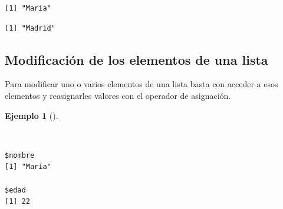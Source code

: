 \documentclass[
  a4paper,
]{scrreport}
\newenvironment{Shaded}{\begin{snugshade}}{\end{snugshade}}
\newcommand{\CommentTok}[1]{\textcolor[rgb]{0.37,0.37,0.37}{#1}}
\newcommand{\DecValTok}[1]{\textcolor[rgb]{0.68,0.00,0.00}{#1}}
\newcommand{\FunctionTok}[1]{\textcolor[rgb]{0.28,0.35,0.67}{#1}}
\newcommand{\NormalTok}[1]{\textcolor[rgb]{0.00,0.23,0.31}{#1}}
\newcommand{\OtherTok}[1]{\textcolor[rgb]{0.00,0.23,0.31}{#1}}
\newcommand{\SpecialCharTok}[1]{\textcolor[rgb]{0.37,0.37,0.37}{#1}}
\newcommand{\StringTok}[1]{\textcolor[rgb]{0.13,0.47,0.30}{#1}}
\theoremstyle{definition}
\theoremstyle{definition}
\newtheorem{example}{Ejemplo}[chapter]
\theoremstyle{remark}
\begin{document}
\begin{Shaded}
\end{Shaded}

\begin{verbatim}
[1] "María"
\end{verbatim}

\begin{Shaded}
\end{Shaded}

\begin{verbatim}
[1] "Madrid"
\end{verbatim}

\hypertarget{modificaciuxf3n-de-los-elementos-de-una-lista}{%
\subsection{Modificación de los elementos de una
lista}\label{modificaciuxf3n-de-los-elementos-de-una-lista}}

Para modificar uno o varios elementos de una lista basta con acceder a
esos elementos y reasignarles valores con el operador de asignación.

\begin{example}[]\protect\hypertarget{exm-modificacion-listas}{}\label{exm-modificacion-listas}

~

\begin{Shaded}
\end{Shaded}

\begin{verbatim}
$nombre
[1] "María"

$edad
[1] 22
\end{verbatim}

\end{example}
\end{document}
